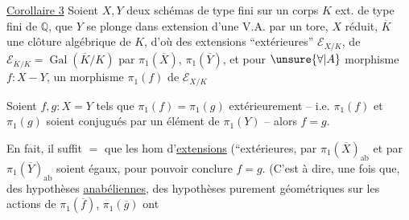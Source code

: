 \uline{Corollaire 3} Soient  $X,Y$ deux schémas de type fini sur un corps $K$ ext. de type fini de $\mathbb Q$,   que $Y$ se plonge dans   extension d'une V.A. par un tore, $X$ réduit,   $\overline K$ une clôture algébrique de $K$, d'où des extensions ``extérieures'' $\mathcal E_{X/K}$,  de $\mathcal E_{\overline K/K}=\operatorname{Gal}(\overline K/K)$ par $\pi_1(\overline X)$, $\pi_1(\overline Y)$, et pour $\unsure{\forall|A}$ morphisme $f:X-Y$, un morphisme $\pi_1(f)$ de $\mathcal E_{X/K}$ 

Soient $f,g:X=Y$ tels que $\pi_1(f)=\pi_1(g)$ extérieurement -- i.e. $\pi_1(f)$ et $\pi_1(g)$ soient conjugués par un élément de $\pi_1(Y)$ -- alors $f=g$.

En fait, il suffit $=$ que les hom d'\uline{extensions} (``extérieures,  par $\pi_1(\overline X)_{\mathrm{ab}}$ et par $\pi_1(\overline Y)_{\mathrm{ab}}$ soient égaux, pour pouvoir conclure $f=g$. (C'est à dire, une fois que,   des hypothèses \uline{anabéliennes}, des hypothèses purement géométriques sur les actions de $\pi_1(\overline f)$, $\pi_1(\overline g)$ ont  
